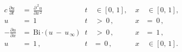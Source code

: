 \begin{align}
c \, \frac{\partial u}{\partial t} 
& = \ \frac{\partial^{\,2} u}{\partial x^{\,2}} \,
& t & \ \in \ \big[ \, 0, \, 1 \, \big] \,, \;&  x & \ \in \ \big[ \, 0, \, 1 \, \big] \,, \\[3pt] 
u
& = \ 1 
& t & \ > \ 0\,, \,&  x & = \ 0 \,, \\[3pt]
- \frac{\partial u}{ \partial x} 
& = \ \mathrm{Bi} \cdot \bigl(\, u \ - \ u_{\,\mathrm{\infty}} \, \bigl) 
& t & \ > \ 0\,, \,&  x & = \ 1 \,, \\[3pt]
u & = \ 1 \,,
& t & = \ 0\,, \,&  x & \ \in \ \big[ \, 0, \, 1 \, \big] \,.
\end{align}